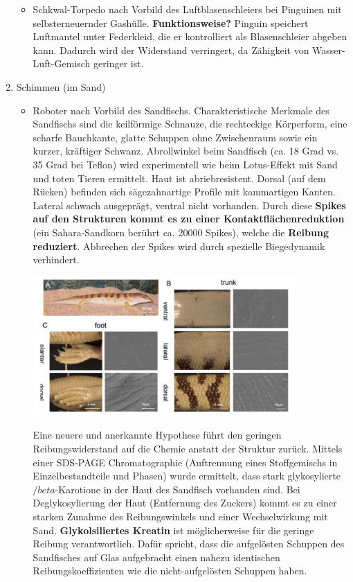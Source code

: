 \begin{enumerate}
\begin{itemize}
        \item Schkwal-Torpedo nach Vorbild des Luftblasenschleiers bei Pinguinen mit selbsterneuernder Gashülle. \textbf{\dangersign Funktionsweise?} Pinguin speichert Luftmantel unter Federkleid, die er kontrolliert als Blasenschleier abgeben kann. Dadurch wird der Widerstand verringert, da Zähigkeit von Wasser-Luft-Gemisch geringer ist.
    \end{itemize}
    \item Schimmen (im Sand)
    \begin{itemize}
        \item Roboter nach Vorbild des Sandfischs. Charakteristische Merkmale des Sandfischs sind die keilförmige Schnauze, die rechteckige Körperform, eine scharfe Bauchkante, glatte Schuppen ohne Zwischenraum sowie ein kurzer, kräftiger Schwanz. Abrollwinkel beim Sandfisch (ca. 18 Grad vs. 35 Grad bei Teflon) wird experimentell wie beim Lotus-Effekt mit Sand und toten Tieren ermittelt. Haut ist abriebresistent. Dorsal (auf dem Rücken) befinden sich sägezahnartige Profile mit kammartigen Kanten. Lateral schwach ausgeprägt, ventral nicht vorhanden. Durch diese \textbf{Spikes auf den Strukturen kommt es zu einer Kontaktflächenreduktion} (ein Sahara-Sandkorn berührt ca. 20000 Spikes), welche die \textbf{Reibung reduziert}. Abbrechen der Spikes wird durch spezielle Biegedynamik verhindert. 
        \begin{center}
            \includegraphics[width=10cm]{lec9/figures/sandfisch.png}
        \end{center}
        \hintsign Eine neuere und anerkannte Hypothese führt den geringen Reibungswiderstand auf die Chemie anstatt der Struktur zurück. Mittels einer SDS-PAGE Chromatographie (Auftrennung eines Stoffgemischs in Einzelbestandteile und Phasen) wurde ermittelt, dass stark glykosylierte $/beta$-Karotione in der Haut des Sandfisch vorhanden sind. Bei Deglykosylierung der Haut (Entfernung des Zuckers) kommt es zu einer starken Zunahme des Reibungswinkels und einer Wechselwirkung mit Sand. \textbf{Glykolsiliertes Kreatin} ist möglicherweise für die geringe Reibung verantwortlich. Dafür spricht, dass die aufgelösten Schuppen des Sandfisches auf Glas aufgebracht einen nahezu identischen Reibungskoeffizienten wie die nicht-aufgelösten Schuppen haben.

\end{itemize}
\end{enumerate}
